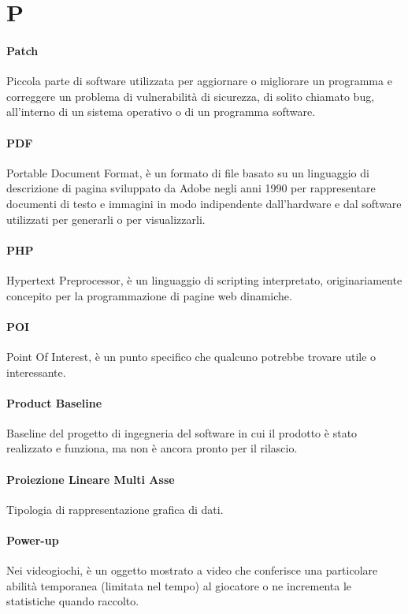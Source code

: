\documentclass[]{article}
\begin{document}
	\newpage
	
	\section*{P}
	
	\paragraph*{Patch}
	Piccola parte di software utilizzata per aggiornare o migliorare un programma e correggere un problema di vulnerabilità di sicurezza, di solito chiamato bug, all'interno di un sistema operativo o di un programma software.
	
	\paragraph*{PDF}
	Portable Document Format, è un formato di file basato su un linguaggio di descrizione di pagina sviluppato da Adobe negli anni 1990 per rappresentare documenti di testo e immagini in modo indipendente dall'hardware e dal software utilizzati per generarli o per visualizzarli.
	
	\paragraph*{PHP}
	Hypertext Preprocessor, è un linguaggio di scripting interpretato, originariamente concepito per la programmazione di pagine web dinamiche.
	
	\paragraph*{POI}
	Point Of Interest, è un punto specifico che qualcuno potrebbe trovare utile o interessante.
	
	\paragraph*{Product Baseline}
	Baseline del progetto di ingegneria del software in cui il prodotto è stato realizzato e funziona, ma non è ancora pronto per il rilascio.
	
	\paragraph*{Proiezione Lineare Multi Asse}
	Tipologia di rappresentazione grafica di dati.
	
	\paragraph*{Power-up}
	Nei videogiochi, è un oggetto mostrato a video che conferisce una particolare abilità temporanea (limitata nel tempo) al giocatore o ne incrementa le statistiche quando raccolto.
	
\end{document}
